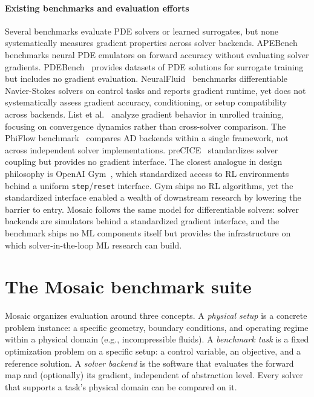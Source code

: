 \documentclass[11pt,a4paper]{article}
\begin{document}
\paragraph{Existing benchmarks and evaluation efforts}
Several benchmarks evaluate PDE solvers or learned surrogates, but none
systematically measures gradient properties across solver backends.
APEBench~\cite{koehler2024apebench} benchmarks neural PDE emulators on
forward accuracy without evaluating solver gradients.
PDEBench~\cite{takamoto2022pdebench} provides datasets of PDE solutions
for surrogate training but includes no gradient evaluation.
NeuralFluid~\cite{fei2024neuralfluid} benchmarks differentiable
Navier-Stokes solvers on control tasks and reports gradient runtime, yet
does not systematically assess gradient accuracy, conditioning, or setup compatibility across backends.
List et al.~\cite{list2024differentiability} analyze gradient behavior in
unrolled training, focusing on convergence dynamics rather than
cross-solver comparison.
The PhiFlow benchmark~\cite{holl2024phiflow} compares AD backends within
a single framework, not across independent solver implementations.
preCICE~\cite{bungartz2016precice} standardizes solver coupling but
provides no gradient interface.
The closest analogue in design philosophy is OpenAI
Gym~\cite{brockman2016openai}, which standardized access to RL
environments behind a uniform \texttt{step}/\texttt{reset} interface.
Gym ships no RL algorithms, yet the standardized interface enabled a
wealth of downstream research by lowering the barrier to entry.
Mosaic follows the same model for differentiable solvers: solver
backends are simulators behind a standardized gradient interface, and
the benchmark ships no ML components itself but provides the
infrastructure on which solver-in-the-loop ML research can build.

\section{The Mosaic benchmark suite}
\label{sec:mosaic}

Mosaic organizes evaluation around three concepts. A \emph{physical
setup} is a concrete problem instance: a specific geometry, boundary
conditions, and operating regime within a physical domain (e.g.,
incompressible fluids). A \emph{benchmark task} is a fixed optimization
problem on a specific setup: a control variable, an objective, and a
reference solution. A \emph{solver backend} is
the software that evaluates the forward map and (optionally) its
gradient, independent of abstraction level. Every solver that supports a
task's physical domain can be compared on it.
\end{document}
